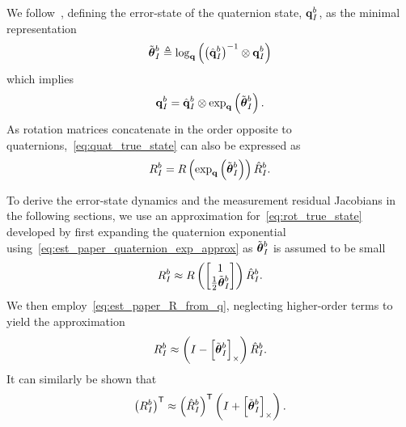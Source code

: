 We follow~\cite{koch2017relative}, defining the error-state of the quaternion
state,
$\boldsymbol{\mathrm{q}}_I^b$,
as the minimal representation
\begin{equation}
  \tilde{\boldsymbol{\mathrm{\theta}}}_I^b \triangleq \log_{\boldsymbol{\mathrm{q}}} \left( \left( \hat{\boldsymbol{\mathrm{q}}}_I^b \right)^{-1}
  \otimes \boldsymbol{\mathrm{q}}_I^b \right)
  \label{eq:quat_error_state}
\end{equation}
which implies
\begin{equation}
  \boldsymbol{\mathrm{q}}_I^b  = \hat{\boldsymbol{\mathrm{q}}}_I^b \otimes \exp_{\boldsymbol{\mathrm{q}}} \left( \tilde{\boldsymbol{\mathrm{\theta}}}_I^b
  \right).
  \label{eq:quat_true_state}
\end{equation}
As rotation matrices concatenate in the order opposite to
quaternions,~\eqref{eq:quat_true_state} can also be expressed as
\begin{equation}
  R_I^b  = R \left( \exp_{\boldsymbol{\mathrm{q}}} \left( \tilde{\boldsymbol{\mathrm{\theta}}}_I^b \right) \right)
  \hat{R}_I^b.
  \label{eq:rot_true_state}
\end{equation}

To derive the error-state dynamics and the measurement residual Jacobians in the
following sections, we
use an approximation for~\eqref{eq:rot_true_state} developed by first expanding
the
quaternion exponential using~\eqref{eq:est_paper_quaternion_exp_approx} as
$\tilde{\boldsymbol{\mathrm{\theta}}}_I^b$ is assumed to be small
\begin{equation}
  R_I^b  \approx R \left( \begin{bmatrix}
      1 \\
    \frac{1}{2} \tilde{\boldsymbol{\mathrm{\theta}}}_I^b
  \end{bmatrix}\right)
  \hat{R}_I^b.
\end{equation}
We then employ~\eqref{eq:est_paper_R_from_q}, neglecting higher-order terms to
yield the approximation
\begin{equation}
  R_I^b  \approx 
  \left( I - \left[ \tilde{\boldsymbol{\mathrm{\theta}}}_I^b \right]_{\times} \right)
  \hat{R}_I^b.
  \label{eq:est_paper_Rapprox}
\end{equation}
It can similarly be shown that
\begin{equation}
  \left( R_I^b \right)^{\mathsf{T}}  \approx 
  \left( \hat{R}_I^b \right)^{\mathsf{T}}
  \left( I + \left[ \tilde{\boldsymbol{\mathrm{\theta}}}_I^b \right]_{\times} \right).
  \label{eq:est_paper_RTapprox}
\end{equation}



